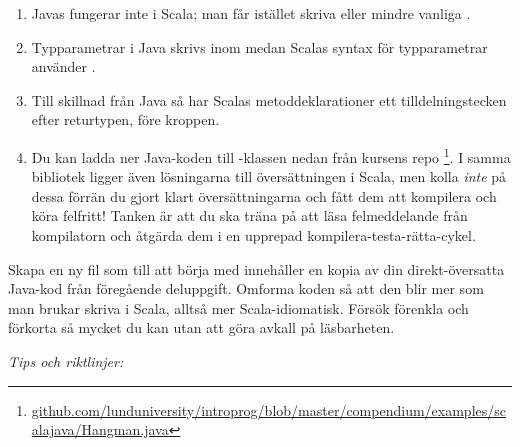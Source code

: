 \begin{enumerate}[noitemsep]
\item Javas  fungerar inte i Scala; man får istället skriva  eller mindre vanliga .

\item Typparametrar i Java skrivs inom \code{<>} medan Scalas syntax för typparametrar använder \code{[]}.

\item Till skillnad från Java så har Scalas metoddeklarationer ett tilldelningstecken \code{=} efter returtypen, före kroppen.

\item Du kan ladda ner Java-koden till -klassen nedan från kursens repo%
\footnote{\href{https://github.com/lunduniversity/introprog/blob/master/compendium/examples/scalajava/Hangman.java}{github.com/lunduniversity/introprog/blob/master/compendium/examples/scalajava/Hangman.java}}. I samma bibliotek ligger även lösningarna till översättningen i Scala, men kolla \emph{inte} på dessa förrän du gjort klart översättningarna och fått dem att kompilera och köra felfritt! Tanken är att du ska träna på att läsa felmeddelande från kompilatorn och åtgärda dem i en upprepad kompilera-testa-rätta-cykel.

\end{enumerate}







\Subtask Skapa en ny fil  som till att börja med innehåller en kopia av din direkt-översatta Java-kod från föregående deluppgift. Omforma koden så att den blir mer som man brukar skriva i Scala, alltså mer Scala-idiomatisk. Försök förenkla och förkorta så mycket du kan utan att göra avkall på läsbarheten.

\emph{Tips och riktlinjer:}

